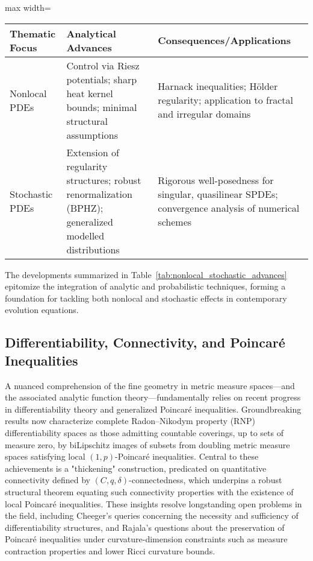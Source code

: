 \documentclass[sigconf]{acmart}
\begin{document}
\begin{table*}[htbp]
\centering
\caption{Core Advances in Nonlocal and Stochastic PDE Analysis}
\label{tab:nonlocal_stochastic_advances}
\begin{adjustbox}{max width=\textwidth}
\begin{tabular}{lll}
\toprule
\textbf{Thematic Focus} & \textbf{Analytical Advances} & \textbf{Consequences/Applications} \\
\midrule
Nonlocal PDEs & Control via Riesz potentials; sharp heat kernel bounds; minimal structural assumptions & Harnack inequalities; Hölder regularity; application to fractal and irregular domains \\
Stochastic PDEs & Extension of regularity structures; robust renormalization (BPHZ); generalized modelled distributions & Rigorous well-posedness for singular, quasilinear SPDEs; convergence analysis of numerical schemes \\
\bottomrule
\end{tabular}
\end{adjustbox}
\end{table*}

The developments summarized in Table~\ref{tab:nonlocal_stochastic_advances} epitomize the integration of analytic and probabilistic techniques, forming a foundation for tackling both nonlocal and stochastic effects in contemporary evolution equations.

\subsection{Differentiability, Connectivity, and Poincaré Inequalities}

A nuanced comprehension of the fine geometry in metric measure spaces—and the associated analytic function theory—fundamentally relies on recent progress in differentiability theory and generalized Poincaré inequalities. Groundbreaking results now characterize complete Radon–Nikodym property (RNP) differentiability spaces as those admitting countable coverings, up to sets of measure zero, by biLipschitz images of subsets from doubling metric measure spaces satisfying local $(1,p)$-Poincaré inequalities. Central to these achievements is a "thickening" construction, predicated on quantitative connectivity defined by $(C, q, \delta)$-connectedness, which underpins a robust structural theorem equating such connectivity properties with the existence of local Poincaré inequalities. These insights resolve longstanding open problems in the field, including Cheeger's queries concerning the necessity and sufficiency of differentiability structures, and Rajala's questions about the preservation of Poincaré inequalities under curvature-dimension constraints such as measure contraction properties and lower Ricci curvature bounds.
\end{document}

